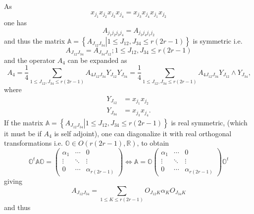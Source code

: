 \documentclass[aps, preprint]{revtex4}
\begin{document}
As
\begin{equation*}x_{j_{1}} x_{j_{2}} x_{j_{3}} x_{j_{4}} =x_{j_{3}} x_{j_{4}} x_{j_{1}} x_{j_{2}}
\end{equation*}one has
\begin{equation*}A_{j_{1} j_{2} j_{3} j_{4}} =A_{j_{3} j_{4} j_{1} j_{2}}
\end{equation*}and thus the matrix $\mathbb{A} =\left \{\left .A_{J_{1 2} J_{3 4}}\right \vert 1 \leq J_{1 2} ,J_{3 4} \leq r \left (2 r -1\right )\right \}$ is symmetric i.e.
\begin{equation*}A_{J_{1 2} J_{3 4}} =A_{J_{3 4} J_{1 2}} ;1 \leq J_{1 2} ,J_{3 4} \leq r \left (2 r -1\right )
\end{equation*}and the operator $A_{4}$ can be expanded as
\begin{equation*}A_{4} =\frac{1}{4} \sum _{1 \leq J_{1 2} ,J_{3 4} \leq r \left (2 r -1\right )}A_{4 J_{1 2} J_{3 4}} Y_{J_{1 2}} Y_{J_{3 4}} =\frac{1}{4} \sum _{1 \leq J_{1 2} ,J_{3 4} \leq r \left (2 r -1\right )}A_{4 J_{1 2} J_{3 4}} Y_{J_{1 2}} \wedge Y_{J_{3 4}}\text{,}
\end{equation*}where
\begin{align*}Y_{J_{1 2}} &  =x_{j_{1}} x_{j_{2}} \\
Y_{J_{3 4}} &  =x_{j_{3}} x_{j_{4}}\text{.}\end{align*}If the matrix $\mathbb{A} =\left \{\left .A_{J_{1 2} J_{3 4}}\right \vert 1 \leq J_{1 2} ,J_{3 4} \leq r \left (2 r -1\right )\right \}$ is real symmetric, (which it must be if $A_{4}$ is self adjoint), one can diagonalize it with real orthogonal transformations i.e. $\mathbb{O} \in O (r \left (2 r -1\right ) ,\mathbb{R})\text{,}$ to obtain
\begin{equation*}\mathbb{O}^{t} \mathbb{A} \mathbb{O} =\left (\begin{array}{ccc}\alpha _{1} & \cdots  & 0 \\
\vdots  & \ddots  & \vdots  \\
0 & \cdots  & \alpha _{r \left (2 r -1\right )}\end{array}\right ) \Longleftrightarrow \mathbb{A} =\mathbb{O} \left (\begin{array}{ccc}\alpha _{1} & \cdots  & 0 \\
\vdots  & \ddots  & \vdots  \\
0 & \cdots  & \alpha _{r \left (2 r -1\right )}\end{array}\right ) \mathbb{O}^{t}
\end{equation*}giving
\begin{equation*}A_{J_{1 2} J_{3 4}} =\sum _{1 \leq K \leq r \left (2 r -1\right )}O_{J_{1 2} K} \alpha _{K} O_{J_{3 4} K}
\end{equation*}and thus
\end{document}
